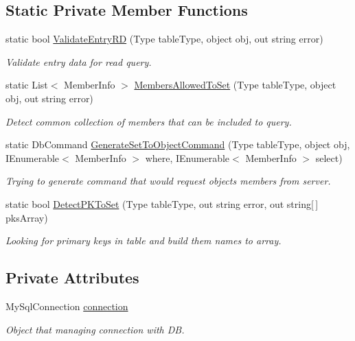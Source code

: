 \subsection*{Static Private Member Functions}
\begin{DoxyCompactItemize}
\item 
static bool \mbox{\hyperlink{class_uniform_data_operator_1_1_sql_1_1_my_sql_1_1_my_sql_data_operator_a821d08d641098b3f5e4dd6342a3db718}{Validate\+Entry\+RD}} (Type table\+Type, object obj, out string error)
\begin{DoxyCompactList}\small\item\em Validate entry data for read query. \end{DoxyCompactList}\item 
static List$<$ Member\+Info $>$ \mbox{\hyperlink{class_uniform_data_operator_1_1_sql_1_1_my_sql_1_1_my_sql_data_operator_ad6b8397c665d57eac1a2680c7b5f44e9}{Members\+Allowed\+To\+Set}} (Type table\+Type, object obj, out string error)
\begin{DoxyCompactList}\small\item\em Detect common collection of members that can be included to query. \end{DoxyCompactList}\item 
static Db\+Command \mbox{\hyperlink{class_uniform_data_operator_1_1_sql_1_1_my_sql_1_1_my_sql_data_operator_a0d3153822bac0ad760aed9f37e58d69b}{Generate\+Set\+To\+Object\+Command}} (Type table\+Type, object obj, I\+Enumerable$<$ Member\+Info $>$ where, I\+Enumerable$<$ Member\+Info $>$ select)
\begin{DoxyCompactList}\small\item\em Trying to generate command that would request objects members from server. \end{DoxyCompactList}\item 
static bool \mbox{\hyperlink{class_uniform_data_operator_1_1_sql_1_1_my_sql_1_1_my_sql_data_operator_a30fd1063d13dae2c7833aed7c405554c}{Detect\+P\+K\+To\+Set}} (Type table\+Type, out string error, out string\mbox{[}$\,$\mbox{]} pks\+Array)
\begin{DoxyCompactList}\small\item\em Looking for primary keys in table and build them names to array. \end{DoxyCompactList}\end{DoxyCompactItemize}
\subsection*{Private Attributes}
\begin{DoxyCompactItemize}
\item 
My\+Sql\+Connection \mbox{\hyperlink{class_uniform_data_operator_1_1_sql_1_1_my_sql_1_1_my_sql_data_operator_a807f034631cd8284ecc020d765e6f6f1}{connection}}
\begin{DoxyCompactList}\small\item\em Object that managing connection with DB. \end{DoxyCompactList}\end{DoxyCompactItemize}


